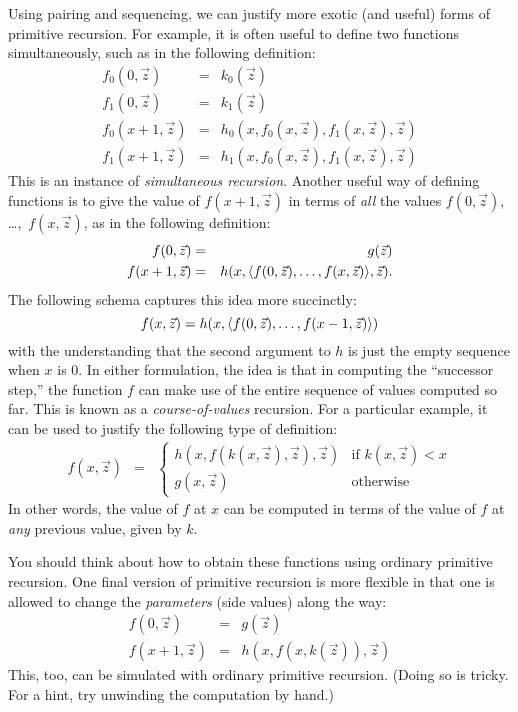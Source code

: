 \documentclass[../../../include/open-logic-section]{subfiles}
\begin{document}

Using pairing and sequencing, we can justify more exotic (and
useful) forms of primitive recursion. For example, it is often useful
to define two functions simultaneously, such as in the following
definition:
\begin{eqnarray*}
f_0(0,\vec z) & = & k_0(\vec z) \\
f_1(0,\vec z) & = & k_1(\vec z) \\
f_0(x+1,\vec z) & = & h_0(x,f_0(x,\vec z),f_1(x,\vec z),\vec z) \\
f_1(x+1,\vec z) & = & h_1(x,f_0(x,\vec z),f_1(x,\vec z),\vec z)
\end{eqnarray*}
This is an instance of \emph{simultaneous recursion}. Another useful
way of defining functions is to give the value of $f(x+1,\vec z)$ in
terms of \emph{all} the values $f(0,\vec z)$, \dots,~$f(x,\vec z)$, as in
the following definition:
\begin{eqnarray*}
f(0,\vec z) & = & g(\vec z) \\
f(x+1,\vec z) & = & h(x, \tuple{f(0,\vec z), \dots, f(x,\vec z)},
\vec z).
\end{eqnarray*}
The following schema captures this idea more succinctly:
\[
f(x,\vec z) = h(x,\langle f(0,\vec z), \dots, f(x-1,\vec z) \rangle)
\]
with the understanding that the second argument to $h$ is just the
empty sequence when $x$ is $0$. In either formulation, the idea is
that in computing the ``successor step,'' the function $f$ can make
use of the entire sequence of values computed so far.
This is known as a \emph{course-of-values} recursion. For a particular
example, it can be used to justify the following type of definition:
\begin{eqnarray*}
f(x,\vec z) & = & \left\{
\begin{array}{ll}
  h(x,f(k(x,\vec z),\vec z),\vec z) & \text{if $k(x,\vec z) < x$} \\
  g(x,\vec z) & \text{otherwise}
\end{array}\right.
\end{eqnarray*}
In other words, the value of $f$ at $x$ can be computed in terms of
the value of $f$ at \emph{any} previous value, given by $k$.

You should think about how to obtain these functions using ordinary
primitive recursion. One final version of primitive recursion is more
flexible in that one is allowed to change the \emph{parameters} (side
values) along the way:
\begin{eqnarray*}
f(0,\vec z) & = & g(\vec z) \\
f(x+1,\vec z) & = & h(x,f(x,k(\vec z)),\vec z)
\end{eqnarray*}
This, too, can be simulated with ordinary primitive recursion. (Doing
so is tricky. For a hint, try unwinding the computation by hand.)
\end{document}
